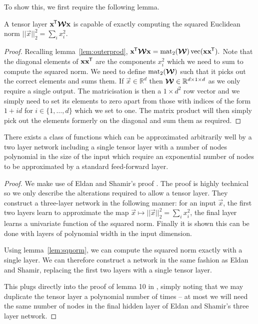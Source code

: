 To show this, we first require the following lemma.
\begin{lem}\label{lem:sqnorm}
	A tensor layer \(\mathbf{x}^{\mkern-1.5mu\mathsf{T}}\bm{\mathcal{W}}\mathbf{x}\) is capable of exactly computing the squared
	Euclidean norm \(||\vec{x}||^2_2 = \sum_i x_i^2\).
\end{lem}
\begin{proof}
Recalling lemma~\ref{lem:outerprod},
\( \label{eq:outerquad}
	\mathbf{x}^{\mkern-1.5mu\mathsf{T}}\bm{\mathcal{W}}\mathbf{x} = \operatorname{mat}_2(\bm{\mathcal{W}}) \operatorname{vec}(\mathbf{x}\mathbf{x}^{\mkern-1.5mu\mathsf{T}}).
\) Note that the diagonal elements of \(\mathbf{x}\mathbf{x}^{\mkern-1.5mu\mathsf{T}}\) are the components
\(x_i^2\) which we need to sum to compute the squared norm. We need to define
\(\operatorname{mat}_2(\bm{\mathcal{W}})\) such that it picks out the correct elements and sums them. If 
\(\vec{x} \in \mathbb{R}^d\) then \(\bm{\mathcal{W}} \in \mathbb{R}^{d \times 1 \times d}\) as we only
require a single output. The matricisation is then a \(1 \times d^2\) row vector and we simply need
to set its elements to zero apart from those with indices of the form \(1 + id\) for 
\(i \in \{1, \ldots, d\}\) which we set to one.
The matrix product will then simply pick out the elements formerly
on the diagonal and sum them as required.
\end{proof}

\begin{thm}
There exists a class of functions which can be approximated arbitrarily well by a two layer network
including a single tensor layer with a number of nodes polynomial in the size of the input which
require an exponential number of nodes to be approximated by a standard feed-forward layer.
\end{thm}
\begin{proof}
We make use of Eldan and Shamir's proof \autocite{Eldan2016}. The proof is highly technical so we 
only describe the alterations required to allow a tensor layer.
They construct a three-layer network in the following manner:
for an input \(\vec{x}\), the first two layers learn to approximate the map 
\(\vec{x}\mapsto ||\vec{x}||^2_2 = \sum_i x_i^2\), the final layer learns a univariate function of the
squared norm. Finally it is shown this can be done with layers of polynomial width in the input
dimension.

Using lemma~\ref{lem:sqnorm}, we can compute the squared norm exactly
with a single layer. We can therefore construct a network in
the same fashion as Eldan and Shamir, replacing the first two layers with a single tensor layer. 

This plugs directly into the proof of lemma 10 in \autocite[18--19]{Eldan2016}, simply noting that
we may duplicate the tensor layer a polynomial number of times -- at most we will need the same number of
nodes in the final hidden layer of Eldan and Shamir's three layer network.
\end{proof}

